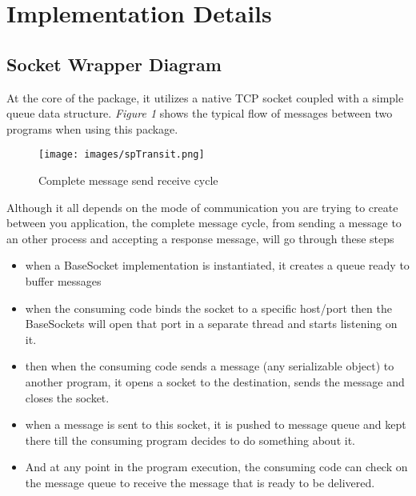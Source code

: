 \documentclass[10pt,journal,compsoc]{IEEEtran}
\begin{document}
\section{Implementation Details}


\subsection{Socket Wrapper Diagram}

At the core of the package, it utilizes a native TCP socket coupled with a simple queue data structure. \emph{Figure 1} shows the typical flow of messages between two programs when using this package.


\begin{figure*}[!t]
\centering
\texttt{[image: images/spTransit.png]}
\caption{Complete message send receive cycle}
\label{fig_sim}
\end{figure*}



Although it all depends on the mode of communication you are trying to create between you application, the complete message cycle, from sending a message to an other process and accepting a response message, will go through these steps

\begin{itemize}

\item when a BaseSocket implementation is instantiated, it creates a queue ready to buffer messages

\item when the consuming code binds the socket to a specific host/port then the BaseSockets will open that port in a separate thread and starts listening on it.


\item then when the consuming code sends a message (any serializable object) to another program, it opens a socket to the destination, sends the message and closes the socket.

\item when a message is sent to this socket, it is pushed to message queue and kept there till the consuming program decides to do something about it.

\item And at any point in the program execution, the consuming code can check on the message queue to receive the message that is ready to be delivered.
\end{itemize}
\end{document}
